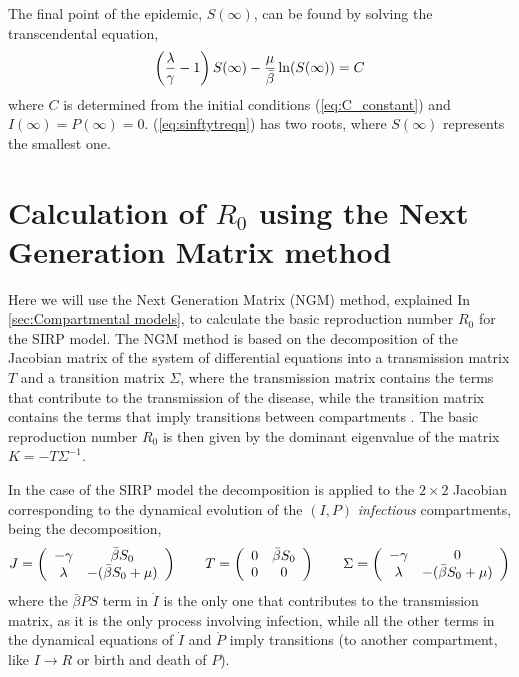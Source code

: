 The final point of the epidemic,  $S(\infty)$, can be found by solving the
transcendental equation,
\begin{equation}
    \left({{\lambda}\over{\gamma}}-1\right)S(\infty)
    -\frac{\mu}{\bar{\beta}}\ln (S(\infty))=C
    \label{eq:sinftytreqn}
\end{equation}
where $C$ is determined from the initial conditions (\cref{eq:C_constant})
and $I(\infty)=P(\infty)=0$.
(\cref{eq:sinftytreqn}) has two roots, where $S({\infty})$ represents the
smallest one.

\section{Calculation of $R_0$ using the Next Generation Matrix
  method}\label{app:NGM}

Here we will use the Next Generation Matrix (NGM) method, explained In
\cref{sec:Compartmental models}, to calculate the basic reproduction number
$R_0$ for the SIRP model. The NGM method is based on the decomposition of the
Jacobian matrix of the system of differential equations into a transmission
matrix $T$ and a transition matrix $\Sigma$, where the transmission matrix
contains the terms that contribute to the transmission of the disease, while
the transition matrix contains the terms that imply transitions between
compartments \cite{Diekmann2000}. The basic reproduction number $R_0$ is then
given by the dominant eigenvalue of the matrix $K=-T\Sigma^{-1}$.

In the case of the SIRP model the decomposition is applied to the $2\times 2$
Jacobian corresponding to the dynamical evolution of the $(I,P)$
\textit{infectious} compartments, being the decomposition,
\begin{equation*}
    J=\left(\begin{array}{cc}
            -\gamma & \bar{\beta} S_0        \\
            \lambda & -(\bar{\beta} S_0+\mu)\end{array}\right)\qquad
    T=\left(\begin{array}{cc}
            0 & \bar{\beta} S_0 \\
            0 & 0
        \end{array}\right) \qquad \Sigma=\left(\begin{array}{cc}
            -\gamma & 0                        \\
            \lambda & -(\bar{\beta} S_0 + \mu)
        \end{array}\right)
\end{equation*}
where the $\bar{\beta} PS$ term in $\dot{I}$ is the only one that contributes
to the transmission matrix, as it is the only process involving infection,
while all the other terms in the dynamical equations of $\dot{I}$ and $\dot{P}$
imply transitions (to another compartment, like $I\rightarrow R$ or birth and
death of $P$).

